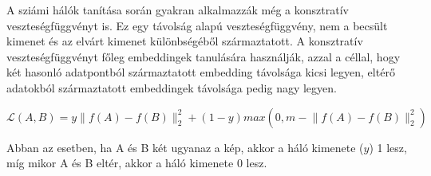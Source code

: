 



A sziámi hálók tanítása során gyakran alkalmazzák még a konsztratív veszteségfüggvényt is. Ez egy távolság alapú veszteségfüggvény, nem a becsült kimenet és az elvárt kimenet különbségéből származtatott. A konsztratív veszteségfüggvényt főleg embeddingek tanulására használják, azzal a céllal, hogy két hasonló adatpontból származtatott embedding távolsága kicsi legyen, eltérő adatokból származtatott embeddingek távolsága pedig nagy legyen. 

\[ \mathcal{L}(A,B) = y \lVert f(A) - f(B)\rVert_2^2 + (1-y) max\left(0,m - \lVert f(A) - f(B) \rVert_2^2 \right) \]

Abban az esetben, ha A és B két ugyanaz a kép, akkor a háló kimenete ($y$) 1 lesz, míg mikor A és B eltér, akkor a háló kimenete 0 lesz. 